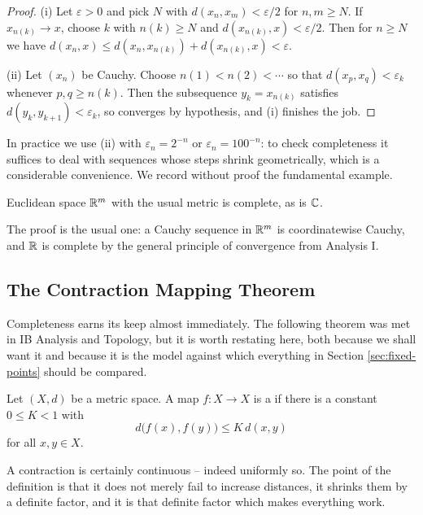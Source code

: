 \documentclass[a4paper]{scrartcl}
\begin{document}
\begin{proof}
	(i) Let $\varepsilon > 0$ and pick $N$ with $d(x_n,x_m) < \varepsilon/2$ for $n,m \geq N$. If $x_{n(k)} \to x$, choose $k$ with $n(k) \geq N$ and $d(x_{n(k)}, x) < \varepsilon/2$. Then for $n \geq N$ we have $d(x_n, x) \leq d(x_n, x_{n(k)}) + d(x_{n(k)},x) < \varepsilon$.

	(ii) Let $(x_n)$ be Cauchy. Choose $n(1) < n(2) < \cdots$ so that $d(x_p, x_q) < \varepsilon_k$ whenever $p,q \geq n(k)$. Then the subsequence $y_k = x_{n(k)}$ satisfies $d(y_k,y_{k+1}) < \varepsilon_k$, so converges by hypothesis, and (i) finishes the job. \qedhere
\end{proof}

In practice we use (ii) with $\varepsilon_n = 2^{-n}$ or $\varepsilon_n = 100^{-n}$: to check completeness it suffices to deal with sequences whose steps shrink geometrically, which is a considerable convenience. We record without proof the fundamental example.

\begin{theorem}
	Euclidean space $\mathbb{R}^m$ with the usual metric is complete, as is $\mathbb{C}$.
\end{theorem}

The proof is the usual one: a Cauchy sequence in $\mathbb{R}^m$ is coordinatewise Cauchy, and $\mathbb{R}$ is complete by the general principle of convergence from Analysis I.

\subsection{The Contraction Mapping Theorem}

Completeness earns its keep almost immediately. The following theorem was met in IB Analysis and Topology, but it is worth restating here, both because we shall want it and because it is the model against which everything in Section \ref{sec:fixed-points} should be compared.

\begin{definition}[Contraction]
	Let $(X,d)$ be a metric space. A map $f : X \to X$ is a  if there is a constant $0 \leq K < 1$ with
	$$d\big(f(x),f(y)\big) \leq K\,d(x,y)$$
	for all $x,y\in X$.
\end{definition}

A contraction is certainly continuous -- indeed uniformly so. The point of the definition is that it does not merely fail to increase distances, it shrinks them by a definite factor, and it is that definite factor which makes everything work.
\end{document}
